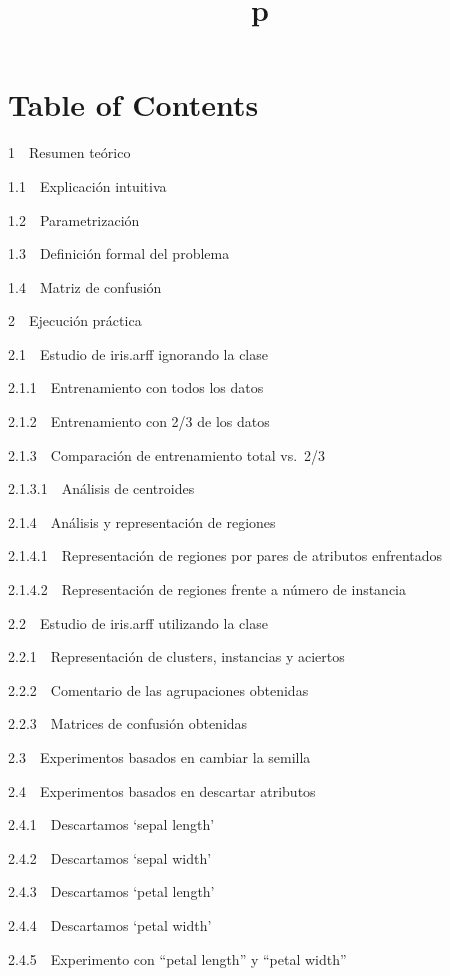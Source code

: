 \documentclass[11pt]{article}
\title{p}
\begin{document}
    
    
    \maketitle
    
    

    
    \section{Table of Contents}\label{table-of-contents}

{1~~}Resumen teórico

{1.1~~}Explicación intuitiva

{1.2~~}Parametrización

{1.3~~}Definición formal del problema

{1.4~~}Matriz de confusión

{2~~}Ejecución práctica

{2.1~~}Estudio de iris.arff ignorando la clase

{2.1.1~~}Entrenamiento con todos los datos

{2.1.2~~}Entrenamiento con 2/3 de los datos

{2.1.3~~}Comparación de entrenamiento total vs.~2/3

{2.1.3.1~~}Análisis de centroides

{2.1.4~~}Análisis y representación de regiones

{2.1.4.1~~}Representación de regiones por pares de atributos enfrentados

{2.1.4.2~~}Representación de regiones frente a número de instancia

{2.2~~}Estudio de iris.arff utilizando la clase

{2.2.1~~}Representación de clusters, instancias y aciertos

{2.2.2~~}Comentario de las agrupaciones obtenidas

{2.2.3~~}Matrices de confusión obtenidas

{2.3~~}Experimentos basados en cambiar la semilla

{2.4~~}Experimentos basados en descartar atributos

{2.4.1~~}Descartamos `sepal length'

{2.4.2~~}Descartamos `sepal width'

{2.4.3~~}Descartamos `petal length'

{2.4.4~~}Descartamos `petal width'

{2.4.5~~}Experimento con ``petal length'' y ``petal width''
\end{document}
